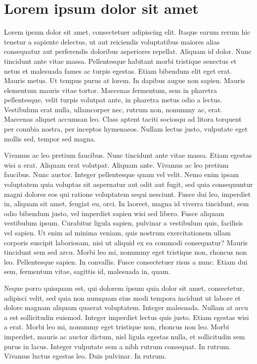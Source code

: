 \section{Lorem ipsum dolor sit amet}

Lorem ipsum dolor sit amet, consectetuer adipiscing elit. Itaque earum rerum hic tenetur a sapiente delectus, ut aut reiciendis voluptatibus maiores alias consequatur aut perferendis doloribus asperiores repellat. Aliquam id dolor. Nunc tincidunt ante vitae massa. Pellentesque habitant morbi tristique senectus et netus et malesuada fames ac turpis egestas. Etiam bibendum elit eget erat. Mauris metus. Ut tempus purus at lorem. In dapibus augue non sapien. Mauris elementum mauris vitae tortor. Maecenas fermentum, sem in pharetra pellentesque, velit turpis volutpat ante, in pharetra metus odio a lectus. Vestibulum erat nulla, ullamcorper nec, rutrum non, nonummy ac, erat. Maecenas aliquet accumsan leo. Class aptent taciti sociosqu ad litora torquent per conubia nostra, per inceptos hymenaeos. Nullam lectus justo, vulputate eget mollis sed, tempor sed magna.

Vivamus ac leo pretium faucibus. Nunc tincidunt ante vitae massa. Etiam egestas wisi a erat. Aliquam erat volutpat. Aliquam ante. Vivamus ac leo pretium faucibus. Nunc auctor. Integer pellentesque quam vel velit. Nemo enim ipsam voluptatem quia voluptas sit aspernatur aut odit aut fugit, sed quia consequuntur magni dolores eos qui ratione voluptatem sequi nesciunt. Fusce dui leo, imperdiet in, aliquam sit amet, feugiat eu, orci. In laoreet, magna id viverra tincidunt, sem odio bibendum justo, vel imperdiet sapien wisi sed libero. Fusce aliquam vestibulum ipsum. Curabitur ligula sapien, pulvinar a vestibulum quis, facilisis vel sapien. Ut enim ad minima veniam, quis nostrum exercitationem ullam corporis suscipit laboriosam, nisi ut aliquid ex ea commodi consequatur? Mauris tincidunt sem sed arcu. Morbi leo mi, nonummy eget tristique non, rhoncus non leo. Pellentesque sapien. In convallis. Fusce consectetuer risus a nunc. Etiam dui sem, fermentum vitae, sagittis id, malesuada in, quam.

Neque porro quisquam est, qui dolorem ipsum quia dolor sit amet, consectetur, adipisci velit, sed quia non numquam eius modi tempora incidunt ut labore et dolore magnam aliquam quaerat voluptatem. Integer malesuada. Nullam at arcu a est sollicitudin euismod. Integer imperdiet lectus quis justo. Etiam egestas wisi a erat. Morbi leo mi, nonummy eget tristique non, rhoncus non leo. Morbi imperdiet, mauris ac auctor dictum, nisl ligula egestas nulla, et sollicitudin sem purus in lacus. Integer vulputate sem a nibh rutrum consequat. In rutrum. Vivamus luctus egestas leo. Duis pulvinar. In rutrum.

